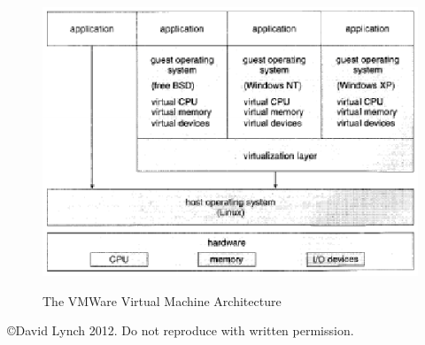 \documentclass[10pt,a4paper]{article}
\begin{document}
\begin{figure}
\caption{The VMWare Virtual Machine Architecture \cite{OSCONCEPTS}}
\begin{center}
\includegraphics[scale=0.45]{../images/vm-arch.png}
\label{vmarch}
\end{center}
\end{figure}
{}

\begin{center}
{\small \copyright  David Lynch 2012. Do not reproduce with written permission.}
\end{center}
\end{document}
